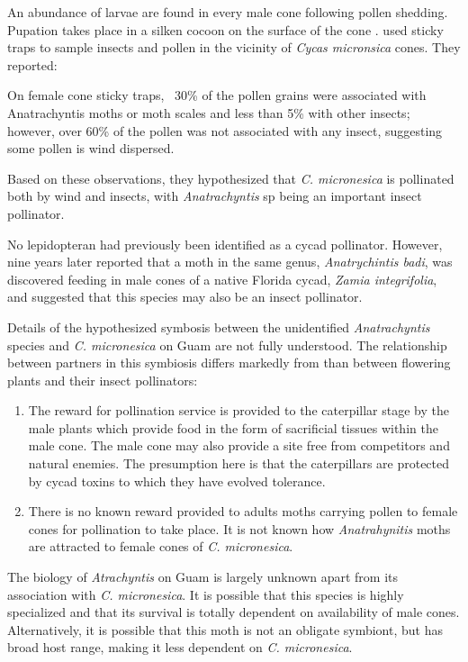 \documentclass[12pt,letterpaper,english,bibliography=totocnumbered, abstract=on]{scrartcl}
\begin{document}
An abundance of larvae are found in every
male cone following pollen shedding. Pupation takes place in a silken cocoon on the surface of the cone \parencite{marlerPestsCycasMicronesica2006}.
\cite{terryConeInsectsPutative2009} used sticky traps to sample insects and pollen in the vicinity of \textit{Cycas micronsica} cones. They reported:

\begin{displayquote}
	On female cone sticky traps, ~30\% of the
	pollen grains were associated with Anatrachyntis moths or moth scales
	and less than 5\% with other insects; however, over 60\% of the pollen
	was not associated with any insect, suggesting some pollen is wind
	dispersed.
\end{displayquote}

Based on these observations, they hypothesized that \textit{C. micronesica} is pollinated both by wind and insects, with \textit{Anatrachyntis} sp being an important insect pollinator.

No lepidopteran had previously been identified as a cycad pollinator. However, nine years later \cite{huaFirstRecordAnatrachyntis2018} reported that a moth in the same genus, \textit{Anatrychintis badi}, was discovered feeding in male cones of a native Florida cycad, \textit{Zamia integrifolia}, and suggested that this species may also be an insect pollinator.

Details of the hypothesized symbosis between the unidentified \textit{Anatrachyntis} species and \textit{C. micronesica} on Guam are not fully understood. The relationship between partners in this symbiosis differs markedly from than between flowering plants and their insect pollinators:
\begin{enumerate}
	\item The reward for pollination service is provided to the caterpillar stage by the male plants which provide food in the form of sacrificial tissues within the male cone. The male cone may also provide a site free from competitors and natural enemies. The presumption here is that the caterpillars are protected by cycad toxins to which they have evolved tolerance.
	\item There is no known reward provided to adults moths carrying pollen to female cones for pollination to take place. It is not known how \textit{Anatrahynitis} moths are attracted to female cones of \textit{C. micronesica}. 
\end{enumerate}

The biology of \textit{Atrachyntis} on Guam is largely unknown apart from its association with \textit{C. micronesica}. It is possible that this species is highly specialized and that its survival is totally dependent on availability of male cones. Alternatively, it is possible that this moth is not an obligate symbiont, but has broad host range, making it less dependent on \textit{C. micronesica}.  
\end{document}
